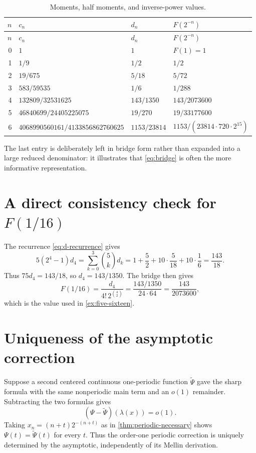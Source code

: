 \documentclass[11pt]{article}
\theoremstyle{definition}
\theoremstyle{remark}
\begin{document}
\begin{longtable}{@{}rlll@{}}
\caption{Moments, half moments, and inverse-power values.}\label{tab:sequence-data}\\
\toprule
$n$&$c_n$&$d_n$&$F(2^{-n})$\\\midrule\endfirsthead
\toprule
$n$&$c_n$&$d_n$&$F(2^{-n})$\\\midrule\endhead
0&$1$&$1$&$F(1)=1$\\
1&$1/9$&$1/2$&$1/2$\\
2&$19/675$&$5/18$&$5/72$\\
3&$583/59535$&$1/6$&$1/288$\\
4&$132809/32531625$&$143/1350$&$143/2073600$\\
5&$46840699/24405225075$&$19/270$&$19/33177600$\\
6&$4068990560161/4133856862760625$&$1153/23814$&$1153/(23814\cdot720\cdot2^{15})$\\
\bottomrule
\end{longtable}
The last entry is deliberately left in bridge form rather than expanded into a large reduced denominator: it illustrates that \eqref{eq:bridge} is often the more informative representation.

\section{A direct consistency check for $F(1/16)$}\label{app:F16}
The recurrence \eqref{eq:d-recurrence} gives
\[
 5(2^4-1)d_4=\sum_{k=0}^{3}\binom5k d_k
 =1+\frac52+10\cdot\frac5{18}+10\cdot\frac16
 =\frac{143}{18}.
\]
Thus $75d_4=143/18$, so $d_4=143/1350$.  The bridge then gives
\[
 F(1/16)=\frac{d_4}{4!\,2^{\binom42}}
 =\frac{143/1350}{24\cdot64}
 =\frac{143}{2073600},
\]
which is the value used in \cref{ex:five-sixteen}.

\section{Uniqueness of the asymptotic correction}\label{app:uniqueness-Psi}
Suppose a second centered continuous one-periodic function $\widetilde\Psi$ gave the sharp formula with the same nonperiodic main term and an $o(1)$ remainder.  Subtracting the two formulas gives
\[
 (\Psi-\widetilde\Psi)(\lambda(x))=o(1).
\]
Taking $x_n=(n+t)2^{-(n+t)}$ as in \cref{thm:periodic-necessary} shows
$\Psi(t)=\widetilde\Psi(t)$ for every $t$.  Thus the order-one periodic correction is uniquely determined by the asymptotic, independently of its Mellin derivation.
\end{document}
